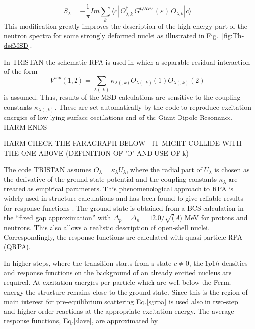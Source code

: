 \documentclass[twocolumn,amsmath,amssymb,10pt,groupedaddress,a4paper]{revtex4}
\begin{document}
\begin{equation}
S_{\lambda} =-\frac{1}{\pi}Im\sum_k\langle c|\,O_{\lambda,k}^{\dagger
}\,G^{QRPA}(\varepsilon )\,O_{\lambda,k}|c\rangle
\label{sgrpa}
\end{equation}
This modification greatly improves the description of the high energy part of the neutron spectra for some strongly deformed nuclei as illustrated in Fig.~\ref{fig:Th-defMSD}.

In TRISTAN the schematic RPA is used in which a separable residual interaction
of the form
\begin{equation}
V^{sep}(1,2)=\sum_{\lambda(,k)}\kappa _{\lambda(,k)}O_{\lambda(,k)}(1)O_{\lambda(,k)}(2)
\end{equation}
\noindent is assumed.
Thus, results of the MSD calculations are sensitive to the coupling
constants $\kappa_{\lambda(,k)}$. These are set automatically by the code to reproduce
excitation energies of low-lying surface oscillations and of the Giant
Dipole Resonance.\\
HARM ENDS


%
%
HARM CHECK THE PARAGRAPH BELOW - IT MIGHT COLLIDE WITH THE ONE ABOVE (DEFINITION OF 'O' AND USE OF k)

The code TRISTAN assumes $O_{\lambda}=\kappa_{\lambda}U_{\lambda}$,
where the radial part of $U_{\lambda}$ is chosen as the derivative
of the ground state potential and the coupling constants $\kappa_{\lambda}$
are treated as empirical parameters. This phenomenological approach
to RPA is widely used in structure calculations and has
been found to give reliable results for response functions \cite{BM,Solv}.
The ground state is obtained from a BCS calculation
in the {}``fixed gap approximation'' with $\Delta_{p}=\Delta_{n}=12.0/\sqrt{(}A)$
MeV for protons and neutrons. This also allows a realistic description
of open-shell nuclei. Correspondingly, the response functions are
calculated with quasi-particle RPA (QRPA).

In higher steps, where the transition starts from a state $c\not=0$,
the $1p1h$ densities and response functions on the background of
an already excited nucleus are required. At excitation energies per
particle which are well below the Fermi energy the structure remains
close to the ground state. Since this is the region of main interest
for pre-equilibrium scattering Eq.\ref{sgrpa} is used also in two-step
and higher order reactions at the appropriate excitation energy. The
average response functions, Eq.\ref{slave}, are approximated by
\end{document}
